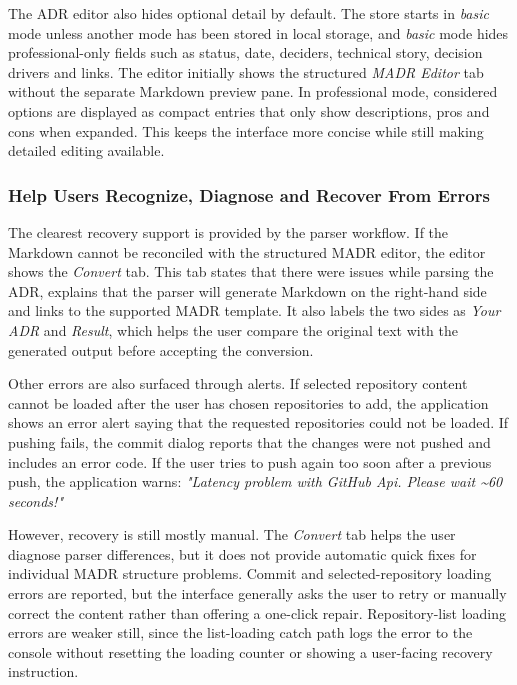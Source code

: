 \documentclass{article}
\begin{document}
The ADR editor also hides optional detail by default. The store starts in \textit{basic} mode unless another mode has been stored in local storage, and \textit{basic} mode hides professional-only fields such as status, date, deciders, technical story, decision drivers and links. The editor initially shows the structured \textit{MADR Editor} tab without the separate Markdown preview pane. In professional mode, considered options are displayed as compact entries that only show descriptions, pros and cons when expanded. This keeps the interface more concise while still making detailed editing available.

\subsubsection{Help Users Recognize, Diagnose and Recover From Errors}
The clearest recovery support is provided by the parser workflow. If the Markdown cannot be reconciled with the structured MADR editor, the editor shows the \textit{Convert} tab. This tab states that there were issues while parsing the ADR, explains that the parser will generate Markdown on the right-hand side and links to the supported MADR template. It also labels the two sides as \textit{Your ADR} and \textit{Result}, which helps the user compare the original text with the generated output before accepting the conversion.

Other errors are also surfaced through alerts. If selected repository content cannot be loaded after the user has chosen repositories to add, the application shows an error alert saying that the requested repositories could not be loaded. If pushing fails, the commit dialog reports that the changes were not pushed and includes an error code. If the user tries to push again too soon after a previous push, the application warns: \textit{"Latency problem with GitHub Api. Please wait \textasciitilde 60 seconds!"}

However, recovery is still mostly manual. The \textit{Convert} tab helps the user diagnose parser differences, but it does not provide automatic quick fixes for individual MADR structure problems. Commit and selected-repository loading errors are reported, but the interface generally asks the user to retry or manually correct the content rather than offering a one-click repair. Repository-list loading errors are weaker still, since the list-loading catch path logs the error to the console without resetting the loading counter or showing a user-facing recovery instruction.
\end{document}
